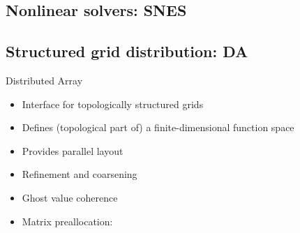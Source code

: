 
\subsection{Nonlinear solvers: SNES}





\subsection{Structured grid distribution: DA}
\begin{frame}{Distributed Array}
  \begin{itemize}
  \item Interface for topologically structured grids
  \item Defines (topological part of) a finite-dimensional function space
  \item Provides parallel layout
  \item Refinement and coarsening
  \item Ghost value coherence
  \item Matrix preallocation: 
  \end{itemize}
\end{frame}











